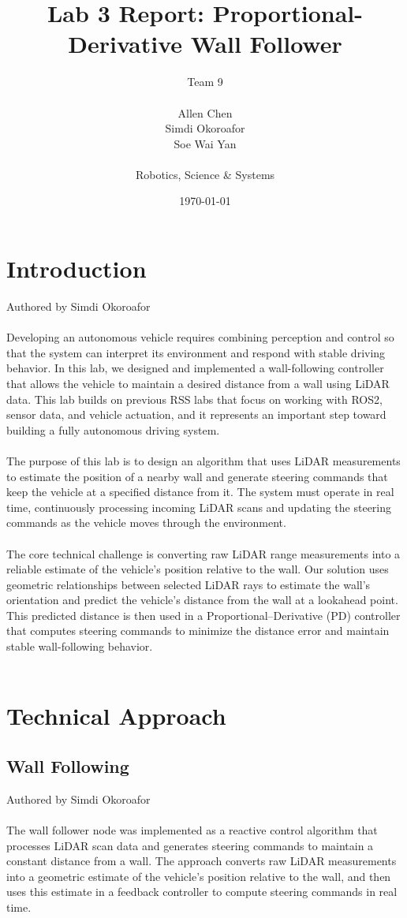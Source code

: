 \documentclass{article}
\title{Lab 3 Report: Proportional-Derivative Wall Follower} %
\author{Team 9 \\\\ Allen Chen \\ Simdi Okoroafor \\ Soe Wai Yan \\\\ Robotics, Science & Systems} %
\date{\today} %
\begin{document}
\maketitle


\section{Introduction}
Authored by Simdi Okoroafor \\\\
Developing an autonomous vehicle requires combining perception and control so that the system can interpret its environment and respond with stable driving behavior. In this lab, we designed and implemented a wall-following controller that allows the vehicle to maintain a desired distance from a wall using LiDAR data. This lab builds on previous RSS labs that focus on working with ROS2, sensor data, and vehicle actuation, and it represents an important step toward building a fully autonomous driving system.\\\\

The purpose of this lab is to design an algorithm that uses LiDAR measurements to estimate the position of a nearby wall and generate steering commands that keep the vehicle at a specified distance from it. The system must operate in real time, continuously processing incoming LiDAR scans and updating the steering commands as the vehicle moves through the environment.\\\\

The core technical challenge is converting raw LiDAR range measurements into a reliable estimate of the vehicle’s position relative to the wall. Our solution uses geometric relationships between selected LiDAR rays to estimate the wall’s orientation and predict the vehicle’s distance from the wall at a lookahead point. This predicted distance is then used in a Proportional–Derivative (PD) controller that computes steering commands to minimize the distance error and maintain stable wall-following behavior.\\\\

\section{Technical Approach}
\subsection{Wall Following} 
Authored by Simdi Okoroafor \\\\
The wall follower node was implemented as a reactive control algorithm that processes LiDAR scan data and generates steering commands to maintain a constant distance from a wall. The approach converts raw LiDAR measurements into a geometric estimate of the vehicle’s position relative to the wall, and then uses this estimate in a feedback controller to compute steering commands in real time.
\end{document}
